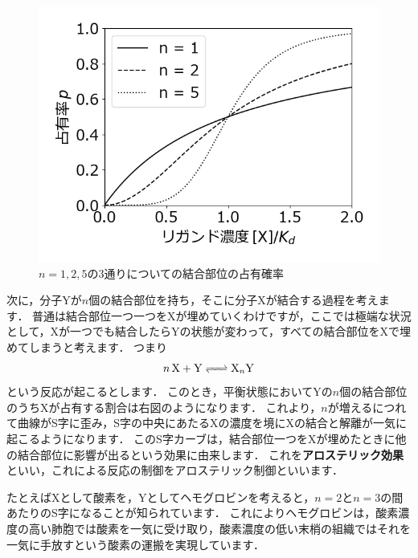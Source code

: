 \documentclass[12pt, a4j, dvipdfmx, sffamily]{jsarticle}
\begin{document}
\begin{tcbraster}[raster columns = 1]
  \begin{tcolorbox}[title = アロステリック制御 , height = 85mm]
		\begin{figure}
			\centering
			\includegraphics[width=\linewidth]{hill_poster.png}
			\caption{$n=1,2,5$の3通りについての結合部位の占有確率}
		 \end{figure}
  次に，分子Yが$n$個の結合部位を持ち，そこに分子Xが結合する過程を考えます．
	普通は結合部位一つ一つをXが埋めていくわけですが，ここでは極端な状況として，Xが一つでも結合したらYの状態が変わって，すべての結合部位をXで埋めてしまうと考えます．
	つまり
	\begin{equation*}
		\ce{$n$X + Y <=> X_{$n$}Y}
	\end{equation*}
	という反応が起こるとします．
	このとき，平衡状態においてYの$n$個の結合部位のうちXが占有する割合は右図のようになります．
	これより，$n$が増えるにつれて曲線がS字に歪み，S字の中央にあたるXの濃度を境にXの結合と解離が一気に起こるようになります．
	このS字カーブは，結合部位一つをXが埋めたときに他の結合部位に影響が出るという効果に由来します．
	これを\textbf{アロステリック効果}といい，これによる反応の制御をアロステリック制御といいます．
  \end{tcolorbox}
	\begin{tcolorbox}[title = 具体例（ヘモグロビン）]
	たとえばXとして酸素を，Yとしてヘモグロビンを考えると，$n=2$と$n=3$の間あたりのS字になることが知られています．
	これによりヘモグロビンは，酸素濃度の高い肺胞では酸素を一気に受け取り，酸素濃度の低い末梢の組織ではそれを一気に手放すという酸素の運搬を実現しています．
	\end{tcolorbox}
\end{tcbraster}
\end{document}
